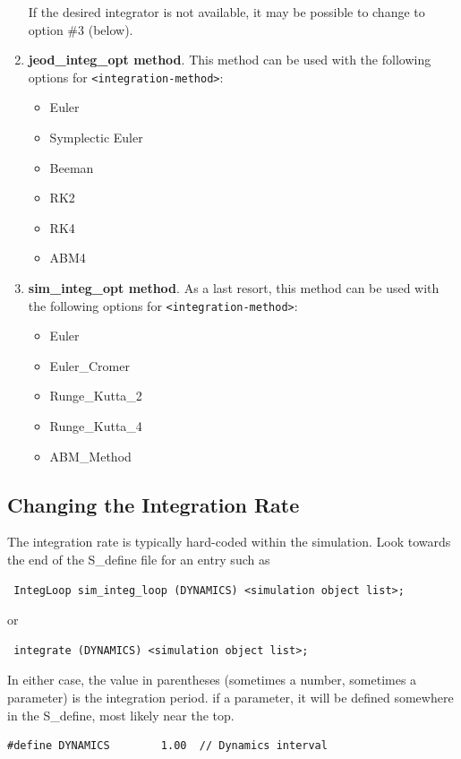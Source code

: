 \begin{enumerate}
 If the desired integrator is not available,
 it may be possible to change to option \#3 (below).

 \item \textbf{jeod\_integ\_opt method}. This method can be used with the 
 following options for \newline \verb+<integration-method>+:
 \begin{itemize}
  \item Euler
  \item Symplectic Euler
  \item Beeman
  \item RK2
  \item RK4
  \item ABM4
 \end{itemize}
 \item \textbf{sim\_integ\_opt method}.  As a last resort, this method can be 
 used with the following options for \verb+<integration-method>+:
 \begin{itemize}
  \item Euler
  \item Euler\_Cromer
  \item Runge\_Kutta\_2
  \item Runge\_Kutta\_4
  \item ABM\_Method
  \end{itemize}
\end{enumerate}

\subsection{Changing the Integration Rate}
The integration rate is typically hard-coded within the simulation.  Look 
towards the end of the S\_define file for an entry such as
  \begin{verbatim}
 IntegLoop sim_integ_loop (DYNAMICS) <simulation object list>;
\end{verbatim}
or
\begin{verbatim}
 integrate (DYNAMICS) <simulation object list>;
\end{verbatim}

In either case, the value in parentheses (sometimes a number, sometimes a 
parameter) is the integration period.  if a parameter, it will be defined 
somewhere in the S\_define, most likely near the top.
\begin{verbatim}
#define DYNAMICS        1.00  // Dynamics interval
\end{verbatim}

